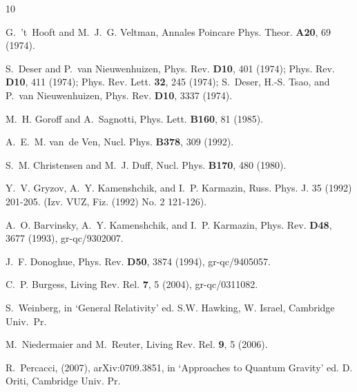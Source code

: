 \documentclass[preprint,preprintnumbers,amsmath,amssymb,nofootinbib,APS]{revtex4}
\newcommand{\2}{\sqrt{2\,}}
\begin{document}
\begin{thebibliography}{10}

G.~'t~Hooft and M.~J.~G. Veltman,
\newblock Annales Poincare Phys. Theor. {\bf A20}, 69 (1974).

S.~Deser and P.~van Nieuwenhuizen,
\newblock Phys. Rev. {\bf D10}, 401 (1974);
\newblock Phys. Rev. {\bf D10}, 411 (1974);
\newblock Phys. Rev. Lett. {\bf 32}, 245 (1974);
S.~Deser, H.-S. Tsao, and P.~van Nieuwenhuizen,
\newblock Phys. Rev. {\bf D10}, 3337 (1974).

M.~H. Goroff and A.~Sagnotti,
\newblock Phys. Lett. {\bf B160}, 81 (1985).

A.~E.~M. van~de Ven,
\newblock Nucl. Phys. {\bf B378}, 309 (1992).

S.~M. Christensen and M.~J. Duff,
\newblock Nucl. Phys. {\bf B170}, 480 (1980).

Y.~V. Gryzov, A.~Y. Kamenshchik, and I.~P. Karmazin,
\newblock Russ. Phys. J. 35 (1992) 201-205. (Izv. VUZ, Fiz. (1992) No. 2
  121-126).

A.~O. Barvinsky, A.~Y. Kamenshchik, and I.~P. Karmazin,
\newblock Phys. Rev. {\bf D48}, 3677 (1993), gr-qc/9302007.

J.~F. Donoghue,
\newblock Phys. Rev. {\bf D50}, 3874 (1994), gr-qc/9405057.

C.~P. Burgess,
\newblock Living Rev. Rel. {\bf 7}, 5 (2004), gr-qc/0311082.

S.~Weinberg,
\newblock in `General Relativity' ed. S.W. Hawking, W. Israel, Cambridge Univ.\
  Pr.

M.~Niedermaier and M.~Reuter,
\newblock Living Rev. Rel. {\bf 9}, 5 (2006).

R.~Percacci,
\newblock (2007), arXiv:0709.3851,
\newblock in `Approaches to Quantum Gravity' ed. D. Oriti, Cambridge Univ. Pr.


\end{thebibliography}
\end{document}
